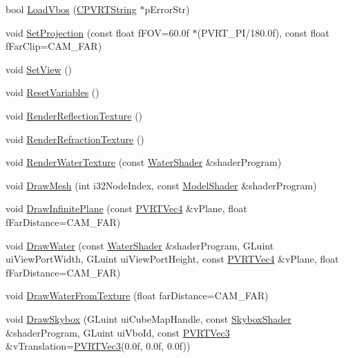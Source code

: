 \begin{DoxyCompactItemize}
bool \hyperlink{class_o_g_l_e_s2_water_ad7899063df59f8a78bd5a6bcb68f786c}{Load\+Vbos} (\hyperlink{class_c_p_v_r_t_string}{C\+P\+V\+R\+T\+String} $\ast$p\+Error\+Str)
\item 
void \hyperlink{class_o_g_l_e_s2_water_a8d754db03b603048817fe9b053614bec}{Set\+Projection} (const float f\+F\+O\+V=60.\+0f $\ast$(\+P\+V\+R\+T\+\_\+\+P\+I/180.\+0f), const float f\+Far\+Clip=\+C\+A\+M\+\_\+\+F\+A\+R)
\item 
void \hyperlink{class_o_g_l_e_s2_water_a572a0d669a41b60e5e9a9c2c7107b905}{Set\+View} ()
\item 
void \hyperlink{class_o_g_l_e_s2_water_a1feb2bde46d6951cb4ccc1f701ad6376}{Reset\+Variables} ()
\item 
void \hyperlink{class_o_g_l_e_s2_water_ac2987db0778ff9b541c419398da933c0}{Render\+Reflection\+Texture} ()
\item 
void \hyperlink{class_o_g_l_e_s2_water_abb62ed9339c576db98486bf882f65f56}{Render\+Refraction\+Texture} ()
\item 
void \hyperlink{class_o_g_l_e_s2_water_aac2a076786e867e30278e5854afeaa23}{Render\+Water\+Texture} (const \hyperlink{struct_water_shader}{Water\+Shader} \&shader\+Program)
\item 
void \hyperlink{class_o_g_l_e_s2_water_a6e83574e9792d7c0b947d58da576c749}{Draw\+Mesh} (int i32\+Node\+Index, const \hyperlink{struct_model_shader}{Model\+Shader} \&shader\+Program)
\item 
void \hyperlink{class_o_g_l_e_s2_water_a496ac5c4ffd659723f0ce4dcc3d716b7}{Draw\+Infinite\+Plane} (const \hyperlink{struct_p_v_r_t_vec4}{P\+V\+R\+T\+Vec4} \&v\+Plane, float f\+Far\+Distance=C\+A\+M\+\_\+\+F\+A\+R)
\item 
void \hyperlink{class_o_g_l_e_s2_water_a8aac4c6a04e6571be5af767c00f403e2}{Draw\+Water} (const \hyperlink{struct_water_shader}{Water\+Shader} \&shader\+Program, G\+Luint ui\+View\+Port\+Width, G\+Luint ui\+View\+Port\+Height, const \hyperlink{struct_p_v_r_t_vec4}{P\+V\+R\+T\+Vec4} \&v\+Plane, float f\+Far\+Distance=C\+A\+M\+\_\+\+F\+A\+R)
\item 
void \hyperlink{class_o_g_l_e_s2_water_a1a297ed4878e31ab9af9c076a3898660}{Draw\+Water\+From\+Texture} (float far\+Distance=C\+A\+M\+\_\+\+F\+A\+R)
\item 
void \hyperlink{class_o_g_l_e_s2_water_adb8a0836b3a9c12f38dcf140eead887b}{Draw\+Skybox} (G\+Luint ui\+Cube\+Map\+Handle, const \hyperlink{struct_skybox_shader}{Skybox\+Shader} \&shader\+Program, G\+Luint ui\+Vbo\+Id, const \hyperlink{struct_p_v_r_t_vec3}{P\+V\+R\+T\+Vec3} \&v\+Translation=\hyperlink{struct_p_v_r_t_vec3}{P\+V\+R\+T\+Vec3}(0.\+0f, 0.\+0f, 0.\+0f))

\end{DoxyCompactItemize}
